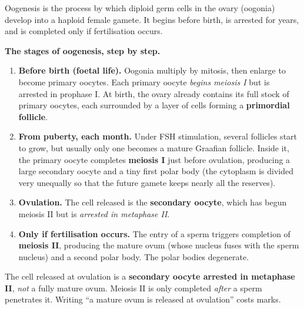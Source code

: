 \documentclass[11pt]{article}
\newcommand{\cle}[1]{{\popxbold\color{popdark}#1}}
\begin{document}
\begin{definition}[Oogenesis]
\cle{Oogenesis} is the process by which diploid germ cells in the ovary (oogonia) develop into a haploid female gamete. It begins before birth, is arrested for years, and is completed only if fertilisation occurs.
\end{definition}

\textbf{The stages of oogenesis, step by step.}
\begin{enumerate}
\item \textbf{Before birth (foetal life).} Oogonia multiply by mitosis, then enlarge to become \cle{primary oocytes}. Each primary oocyte \emph{begins meiosis I} but is arrested in prophase I. At birth, the ovary already contains its full stock of primary oocytes, each surrounded by a layer of cells forming a \textbf{primordial follicle}.
\item \textbf{From puberty, each month.} Under FSH stimulation, several follicles start to grow, but usually only one becomes a mature \cle{Graafian follicle}. Inside it, the primary oocyte completes \textbf{meiosis I} just before ovulation, producing a large \cle{secondary oocyte} and a tiny \cle{first polar body} (the cytoplasm is divided very unequally so that the future gamete keeps nearly all the reserves).
\item \textbf{Ovulation.} The cell released is the \textbf{secondary oocyte}, which has begun meiosis II but is \emph{arrested in metaphase II}.
\item \textbf{Only if fertilisation occurs.} The entry of a sperm triggers completion of \textbf{meiosis II}, producing the mature \cle{ovum} (whose nucleus fuses with the sperm nucleus) and a \cle{second polar body}. The polar bodies degenerate.
\end{enumerate}

\begin{attention}
The cell released at ovulation is a \textbf{secondary oocyte arrested in metaphase II}, \emph{not} a fully mature ovum. Meiosis II is only completed \emph{after} a sperm penetrates it. Writing ``a mature ovum is released at ovulation'' costs marks.
\end{attention}
\end{document}
